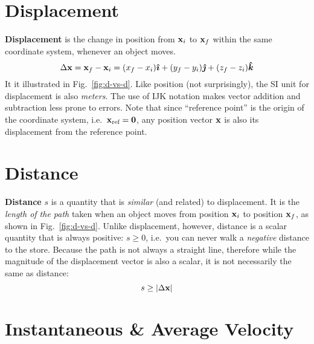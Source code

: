 \documentclass{../../../oss-handout}
\newcommand{\mb}[1]{\ensuremath\mathbf{#1}}
\begin{document}
\section{Displacement}

\textbf{Displacement} is the change in position from $\mb{x}_i$ to
$\mb{x}_f$ within the same coordinate system, whenever an object moves.
\begin{equation*}
  \Delta\mb{x}=\mb{x}_f-\mb{x}_i
  =(x_f-x_i)\bm{\hat{\imath}}+
  (y_f-y_i)\bm{\hat{\jmath}}+
  (z_f-z_i)\bm{\hat{k}}
\end{equation*}
It it illustrated in Fig.~\ref{fig:d-vs-d}. Like position (not surprisingly),
the SI unit for displacement is also \emph{meters}. The use of IJK notation
makes vector addition and subtraction less prone to errors. Note that since
``reference point'' is the origin of the coordinate system, i.e.\
$\mb{x}_{\textrm{ref}}=\mb{0}$, any position vector $\mb{x}$ is also its
displacement from the reference point.



\section{Distance}%

\textbf{Distance} $s$ is a quantity that is \emph{similar} (and related) to
displacement. It is the \emph{length of the path} taken when an object moves
from position $\mb{x}_i$ to position $\mb{x}_f$, as shown in
Fig.~\ref{fig:d-vs-d}. Unlike displacement, however, distance is a scalar
quantity that is always positive: $s\geq 0$, i.e.\ you can never walk a
\emph{negative} distance to the store. Because the path is not always a
straight line, therefore while the magnitude of the displacement vector is also
a scalar, it is not necessarily the same as distance:
\begin{equation*}
  s\geq |\Delta\mb{x}|
\end{equation*}


\section{Instantaneous \& Average Velocity}
\end{document}
